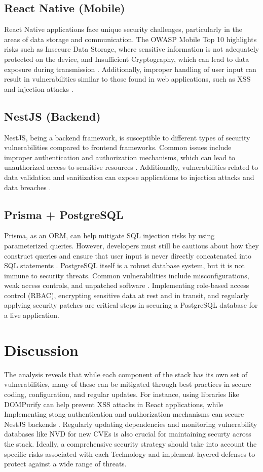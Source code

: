 \documentclass[conference]{IEEEtran}
\begin{document}
\subsection{React Native (Mobile)}
React Native applications face unique security challenges, particularly in the areas of data storage and communication. The OWASP Mobile Top 10 highlights risks such as Insecure Data Storage, where sensitive information is not adequately protected on the device, and Insufficient Cryptography, which can lead to data exposure during transmission \cite{owaspMobile}. Additionally, improper handling of user input can result in vulnerabilities similar to those found in web applications, such as XSS and injection attacks \cite{reactNativeSec}.

\subsection{NestJS (Backend)}
NestJS, being a backend framework, is susceptible to different types of security vulnerabilities compared to frontend frameworks. Common issues include improper authentication and authorization mechanisms, which can lead to unauthorized access to sensitive resources \cite{nestjs}. Additionally, vulnerabilities related to data validation and sanitization can expose applications to injection attacks and data breaches \cite{nestjs}.

\subsection{Prisma + PostgreSQL}
Prisma, as an ORM, can help mitigate SQL injection risks by using parameterized queries. However, developers must still be cautious about how they construct queries and ensure that user input is never directly concatenated into SQL statements \cite{databaseFlaw}. PostgreSQL itself is a robust database system, but it is not immune to security threats. Common vulnerabilities include misconfigurations, weak access controls, and unpatched software \cite{databaseFlaw}. Implementing role-based access control (RBAC), encrypting sensitive data at rest and in transit, and regularly applying security patches are critical steps in securing a PostgreSQL database for a live application.

\section{Discussion}
The analysis reveals that while each component of the stack has its own set of vulnerabilities, many of these can be mitigated through best practices in secure coding, configuration, and regular updates. For instance, using libraries like DOMPurify can help prevent XSS attacks in React applications, while Implementing stong authentication and authorization mechanisms can secure NestJS backends \cite{nestjsSec}. Regularly updating dependencies and monitoring vulnerability databases like NVD for new CVEs is also crucial for maintaining securty across the stack.
Ideally, a comprehensive security strategy should take into account the specific risks associated with each Technology and implement layered defenses to protect against a wide range of threats.
\end{document}
